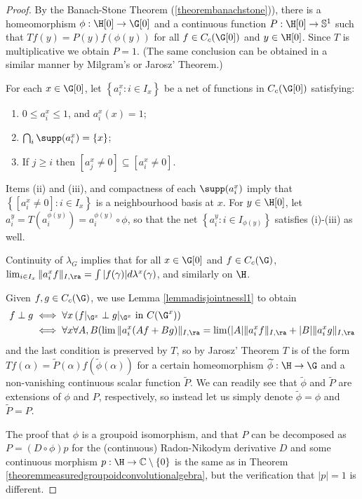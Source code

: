 \begin{proof}
By the Banach-Stone Theorem (\ref{theorembanachstone})), there is a homeomorphism $\phi:\H[0]\to\G[0]$ and a continuous function $P:\H[0]\to\mathbb{S}^1$ such that $Tf(y)=P(y)f(\phi(y))$ for all $f\in C_c(\G[0])$ and $y\in\H[0]$. Since $T$ is multiplicative we obtain $P=1$. (The same conclusion can be obtained in a similar manner by Milgram's or Jarosz' Theorem.)

For each $x\in\G[0]$, let $\left\{a^x_i:i\in I_x\right\}$ be a net of functions in $C_c(\G[0])$ satisfying:
\begin{enumerate}
\item[(i)] $0\leq a^x_i\leq 1$, and $a^x_i(x)=1$;
\item[(ii)] $\bigcap_i\supp(a^x_i)=\left\{x\right\}$;
\item[(iii)] If $j\geq i$ then $[a^x_j\neq 0]\subseteq[a^x_i\neq 0]$.
\end{enumerate}
Items (ii) and (iii), and compactness of each $\supp(a^x_i)$ imply that $\left\{[a^x_i\neq 0]:i\in I_x\right\}$ is a neighbourhood basis at $x$. For $y\in\H[0]$, let $a^y_i=T(a^{\phi(y)}_i)=a^{\phi(y)}_i\circ\phi$, so that the net $\left\{a^y_i:i\in I_{\phi(y)}\right\}$ satisfies (i)-(iii) as well.

Continuity of $\lambda_G$ implies that for all $x\in \G[0]$ and $f\in C_c(\G)$, $\lim_{i\in I_x}\Vert a^x_i f\Vert_{I,\ra}=\int |f(\gamma)|d\lambda^x(\gamma)$, and similarly on $\H$.

Given $f,g\in C_c(\G)$, we use Lemma \ref{lemmadisjointnessl1} to obtain
\begin{align*}
f\perp g&\iff\forall x\left(f|_{\G^x}\perp g|_{\G^x}\text{ in }C(\G^x)\right)\\
&\iff\forall x\forall A,B(\lim\Vert a^x_i(Af+Bg)\Vert_{I,\ra}=\lim(|A|\Vert a^x_i f\Vert_{I,\ra}+|B|\Vert a^x_i g\Vert_{I,\ra}
\end{align*}
and the last condition is preserved by $T$, so by Jarosz' Theorem $T$ is of the form $Tf(\alpha)=\widetilde{P}(\alpha)f(\widetilde{\phi}(\alpha))$ for a certain homeomorphism $\widetilde{\phi}:\H\to\G$ and a non-vanishing continuous scalar function $\widetilde{P}$. We can readily see that $\widetilde{\phi}$ and $\widetilde{P}$ are extensions of $\phi$ and $P$, respectively, so instead let us simply denote $\widetilde{\phi}=\phi$ and $\widetilde{P}=P$.

The proof that $\phi$ is a groupoid isomorphism, and that $P$ can be decomposed as $P=(D\circ\phi)p$ for the (continuous) Radon-Nikodym derivative $D$ and some continuous morphism $p:\H\to\mathbb{C}\setminus\left\{0\right\}$ is the same as in Theorem \ref{theoremmeasuredgroupoidconvolutionalgebra}, but the verification that $|p|=1$ is different.


\end{proof}
